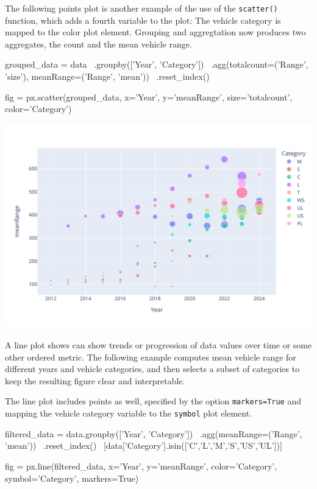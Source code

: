 The following points plot  is another example of the use of the \texttt{scatter()} function, which adds a fourth variable to the plot: The vehicle category is mapped to the color plot element. Grouping and aggregtation now produces two aggregates, the count and the mean vehicle range.  

\begin{samepage}
\begin{pythoncode}
grouped_data = data \
    .groupby(['Year', 'Category']) \
    .agg(totalcount=('Range', 'size'),
         meanRange=('Range', 'mean')) \
    .reset_index()
    
fig = px.scatter(grouped_data, 
           x='Year', y='meanRange', 
           size='totalcount', color='Category')
\end{pythoncode}
\end{samepage}

\begin{center}
  \includegraphics[width=.8\textwidth]{px.fuel.pointsSize.pdf}
\end{center}

A line plot\index{Plot!Line} shows can show trends or progression of data values over time or some other ordered metric. The following example computes mean vehicle range for different years and vehicle categories, and then selects a subset of categories to keep the resulting figure clear and interpretable. 

The line plot includes points as well, specified by the option \texttt{markers=True} and mapping the vehicle category variable to the \texttt{symbol} plot element. 

\begin{samepage}
\begin{pythoncode}
filtered_data = 
    data.groupby(['Year', 'Category']) \
       .agg(meanRange=('Range', 'mean')) \
       .reset_index() \
       [data['Category'].isin(['C','L','M','S','US','UL'])] 
       
fig = px.line(filtered_data, 
    x='Year', y='meanRange', color='Category', 
    symbol='Category', markers=True)
\end{pythoncode}
\end{samepage}

